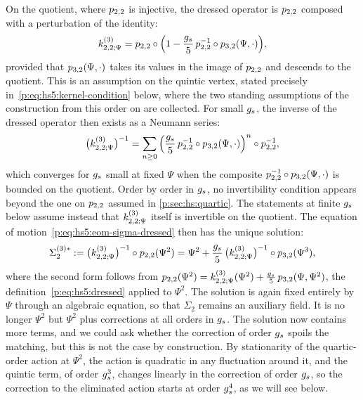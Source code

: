 On the quotient, where $p_{2,2}$ is injective, the dressed operator is $p_{2,2}$ composed with a perturbation of the identity:
\begin{equation}
  \label{p:eq:hs5:dressed-factor}
  \kin{2}{\Psi}{3}
    = \sprod{2}{2} \circ \Big( 1 - \frac{\gs}{5} \, \sprod{2}{2}^{-1} \circ \sprod{3}{2}(\Psi, \cdot) \Big),
\end{equation}
provided that $p_{3,2}(\Psi, \cdot)$ takes its values in the image of $p_{2,2}$ and descends to the quotient.
This is an assumption on the quintic vertex, stated precisely in~\eqref{p:eq:hs5:kernel-condition} below, where the two standing assumptions of the construction from this order on are collected.
For small $g_s$, the inverse of the dressed operator then exists as a Neumann series:
\begin{equation}
  \label{p:eq:hs5:neumann}
  \big( \kin{2}{\Psi}{3} \big)^{-1}
    = \sum_{n \ge 0} \Big( \frac{\gs}{5} \, \sprod{2}{2}^{-1} \circ \sprod{3}{2}(\Psi, \cdot) \Big)^n \circ \sprod{2}{2}^{-1},
\end{equation}
which converges for $g_s$ small at fixed $\Psi$ when the composite $p_{2,2}^{-1} \circ p_{3,2}(\Psi, \cdot)$ is bounded on the quotient.
Order by order in $g_s$, no invertibility condition appears beyond the one on $p_{2,2}$ assumed in \cref{p:sec:hs:quartic}.
The statements at finite $g_s$ below assume instead that $\kin{2}{\Psi}{3}$ itself is invertible on the quotient.
The equation of motion~\eqref{p:eq:hs5:eom-sigma-dressed} then has the unique solution:
\begin{equation}
  \label{p:eq:hs5:saddle}
  \Sigma_2^{(3)*}
    := \big( \kin{2}{\Psi}{3} \big)^{-1} \circ \sprod{2}{2}(\Psi^2)
    = \Psi^2 + \frac{\gs}{5} \, \big( \kin{2}{\Psi}{3} \big)^{-1} \circ \sprod{3}{2}(\Psi^3),
\end{equation}
where the second form follows from $\sprod{2}{2}(\Psi^2) = \kin{2}{\Psi}{3}(\Psi^2) + \tfrac{\gs}{5} \, \sprod{3}{2}(\Psi, \Psi^2)$, the definition~\eqref{p:eq:hs5:dressed} applied to $\Psi^2$.
The solution is again fixed entirely by $\Psi$ through an algebraic equation, so that $\Sigma_2$ remains an auxiliary field.
It is no longer $\Psi^2$ but $\Psi^2$ plus corrections at all orders in $g_s$.
The solution now contains more terms, and we could ask whether the correction of order $g_s$ spoils the matching, but this is not the case by construction.
By stationarity of the quartic-order action at $\Psi^2$, the action is quadratic in any fluctuation around it, and the quintic term, of order $g_s^3$, changes linearly in the correction of order $g_s$, so the correction to the eliminated action starts at order $g_s^4$, as we will see below.

